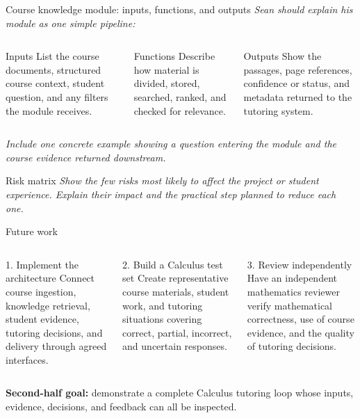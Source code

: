 \documentclass[aspectratio=169,10pt]{beamer}
\begin{document}
\begin{frame}{Course knowledge module: inputs, functions, and outputs}
\vspace{1em}
{\color{Muted}\itshape Sean should explain his module as one simple pipeline:}
\vspace{.8em}

\begin{columns}[T,onlytextwidth]
\begin{block}{Inputs}
List the course documents, structured course context, student question, and any filters the module receives.
\end{block}
\begin{block}{Functions}
Describe how material is divided, stored, searched, ranked, and checked for relevance.
\end{block}
\begin{block}{Outputs}
Show the passages, page references, confidence or status, and metadata returned to the tutoring system.
\end{block}
\end{columns}
\vspace{.55em}
\centering
{\color{Muted}\itshape Include one concrete example showing a question entering the module and the course evidence returned downstream.}
\end{frame}

\begin{frame}{Risk matrix}
\vspace{1em}
{\color{Muted}\itshape Show the few risks most likely to affect the project or student experience. Explain their impact and the practical step planned to reduce each one.}
\end{frame}

\begin{frame}{Future work}
\begin{columns}[T,onlytextwidth]
\begin{block}{1. Implement the architecture}
Connect course ingestion, knowledge retrieval, student evidence, tutoring decisions, and delivery through agreed interfaces.
\end{block}
\begin{block}{2. Build a Calculus test set}
Create representative course materials, student work, and tutoring situations covering correct, partial, incorrect, and uncertain responses.
\end{block}
\begin{block}{3. Review independently}
Have an independent mathematics reviewer verify mathematical correctness, use of course evidence, and the quality of tutoring decisions.
\end{block}
\end{columns}
\vspace{.7em}
\centering
\textbf{Second-half goal:} demonstrate a complete Calculus tutoring loop whose inputs, evidence, decisions, and feedback can all be inspected.
\end{frame}
\end{document}

